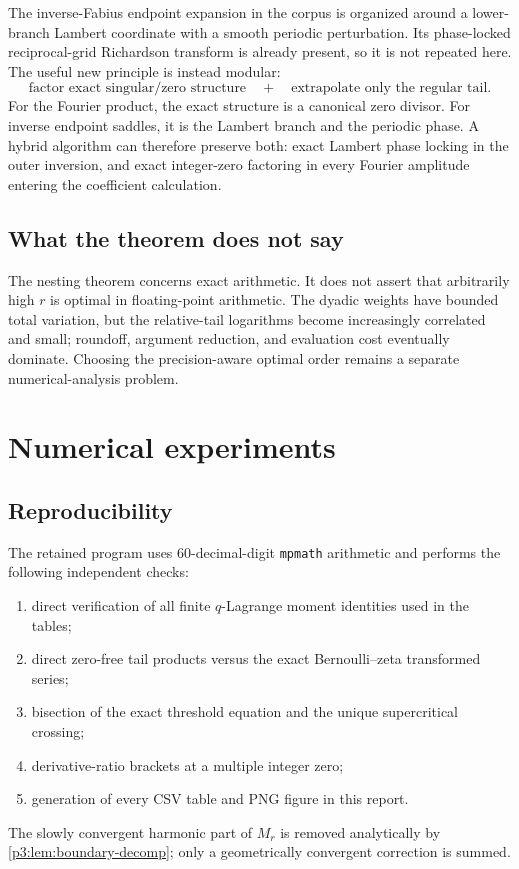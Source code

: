 \documentclass[11pt]{article}
\numberwithin{equation}{section}
\theoremstyle{definition}
\theoremstyle{remark}
\begin{document}
The inverse-Fabius endpoint expansion in the corpus is organized around a lower-branch
Lambert coordinate with a smooth periodic perturbation.  Its phase-locked reciprocal-grid
Richardson transform is already present, so it is not repeated here.  The useful new
principle is instead modular:
\begin{equation}
 \text{factor exact singular/zero structure}\quad+\quad
 \text{extrapolate only the regular tail}.
 \label{p3:eq:modular-principle}
\end{equation}
For the Fourier product, the exact structure is a canonical zero divisor.  For inverse
endpoint saddles, it is the Lambert branch and the periodic phase.  A hybrid algorithm can
therefore preserve both: exact Lambert phase locking in the outer inversion, and exact
integer-zero factoring in every Fourier amplitude entering the coefficient calculation.

\subsection{What the theorem does not say}

The nesting theorem concerns exact arithmetic.  It does not assert that arbitrarily high
$r$ is optimal in floating-point arithmetic.  The dyadic weights have bounded total
variation, but the relative-tail logarithms become increasingly correlated and small;
roundoff, argument reduction, and evaluation cost eventually dominate.  Choosing the
precision-aware optimal order remains a separate numerical-analysis problem.

\section{Numerical experiments}\label{p3:sec:numerics}

\subsection{Reproducibility}

The retained program
uses 60-decimal-digit
\texttt{mpmath} arithmetic and performs the following independent checks:
\begin{enumerate}
\item direct verification of all finite $q$-Lagrange moment identities used in the tables;
\item direct zero-free tail products versus the exact Bernoulli--zeta transformed series;
\item bisection of the exact threshold equation and the unique supercritical crossing;
\item derivative-ratio brackets at a multiple integer zero;
\item generation of every CSV table and PNG figure in this report.
\end{enumerate}
The slowly convergent harmonic part of $M_r$ is removed analytically by
\cref{p3:lem:boundary-decomp}; only a geometrically convergent correction is summed.
\end{document}
